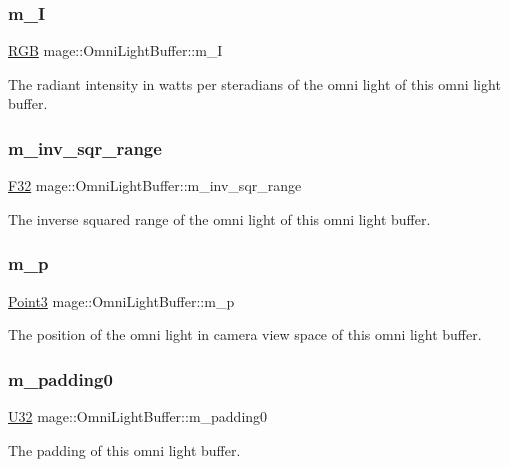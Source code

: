 \subsubsection{\texorpdfstring{m\+\_\+I}{m\_I}}
{\footnotesize\ttfamily \hyperlink{structmage_1_1_r_g_b}{R\+GB} mage\+::\+Omni\+Light\+Buffer\+::m\+\_\+I}

The radiant intensity in watts per steradians of the omni light of this omni light buffer. \hypertarget{structmage_1_1_omni_light_buffer_a156d844a76bb2a98859263128740a95b}{}\label{structmage_1_1_omni_light_buffer_a156d844a76bb2a98859263128740a95b} 
\subsubsection{\texorpdfstring{m\+\_\+inv\+\_\+sqr\+\_\+range}{m\_inv\_sqr\_range}}
{\footnotesize\ttfamily \hyperlink{namespacemage_aa97e833b45f06d60a0a9c4fc22ae02c0}{F32} mage\+::\+Omni\+Light\+Buffer\+::m\+\_\+inv\+\_\+sqr\+\_\+range}

The inverse squared range of the omni light of this omni light buffer. \hypertarget{structmage_1_1_omni_light_buffer_a777b98a686a7e39bd7b401748629d9fc}{}\label{structmage_1_1_omni_light_buffer_a777b98a686a7e39bd7b401748629d9fc} 
\subsubsection{\texorpdfstring{m\+\_\+p}{m\_p}}
{\footnotesize\ttfamily \hyperlink{structmage_1_1_point3}{Point3} mage\+::\+Omni\+Light\+Buffer\+::m\+\_\+p}

The position of the omni light in camera view space of this omni light buffer. \hypertarget{structmage_1_1_omni_light_buffer_af75a020722cd8eb37b91fe42a5b0ad5c}{}\label{structmage_1_1_omni_light_buffer_af75a020722cd8eb37b91fe42a5b0ad5c} 
\subsubsection{\texorpdfstring{m\+\_\+padding0}{m\_padding0}}
{\footnotesize\ttfamily \hyperlink{namespacemage_a41c104c036fba3756a74e19f793eeaa1}{U32} mage\+::\+Omni\+Light\+Buffer\+::m\+\_\+padding0}

The padding of this omni light buffer. 